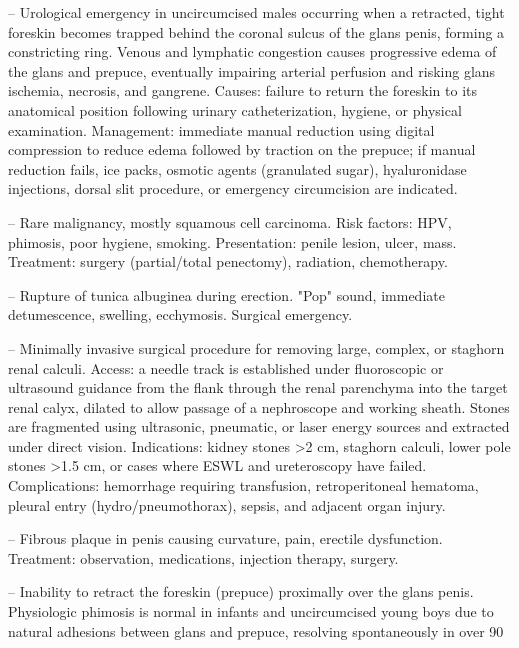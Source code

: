 -- Urological emergency in uncircumcised males occurring when a retracted, tight foreskin becomes trapped behind the coronal sulcus of the glans penis, forming a constricting ring. Venous and lymphatic congestion causes progressive edema of the glans and prepuce, eventually impairing arterial perfusion and risking glans ischemia, necrosis, and gangrene. Causes: failure to return the foreskin to its anatomical position following urinary catheterization, hygiene, or physical examination. Management: immediate manual reduction using digital compression to reduce edema followed by traction on the prepuce; if manual reduction fails, ice packs, osmotic agents (granulated sugar), hyaluronidase injections, dorsal slit procedure, or emergency circumcision are indicated.

-- Rare malignancy, mostly squamous cell carcinoma. Risk factors: HPV, phimosis, poor hygiene, smoking. Presentation: penile lesion, ulcer, mass. Treatment: surgery (partial/total penectomy), radiation, chemotherapy.

-- Rupture of tunica albuginea during erection. "Pop" sound, immediate detumescence, swelling, ecchymosis. Surgical emergency.

-- Minimally invasive surgical procedure for removing large, complex, or staghorn renal calculi. Access: a needle track is established under fluoroscopic or ultrasound guidance from the flank through the renal parenchyma into the target renal calyx, dilated to allow passage of a nephroscope and working sheath. Stones are fragmented using ultrasonic, pneumatic, or laser energy sources and extracted under direct vision. Indications: kidney stones >2 cm, staghorn calculi, lower pole stones >1.5 cm, or cases where ESWL and ureteroscopy have failed. Complications: hemorrhage requiring transfusion, retroperitoneal hematoma, pleural entry (hydro/pneumothorax), sepsis, and adjacent organ injury.

-- Fibrous plaque in penis causing curvature, pain, erectile dysfunction. Treatment: observation, medications, injection therapy, surgery.

-- Inability to retract the foreskin (prepuce) proximally over the glans penis. Physiologic phimosis is normal in infants and uncircumcised young boys due to natural adhesions between glans and prepuce, resolving spontaneously in over 90%


